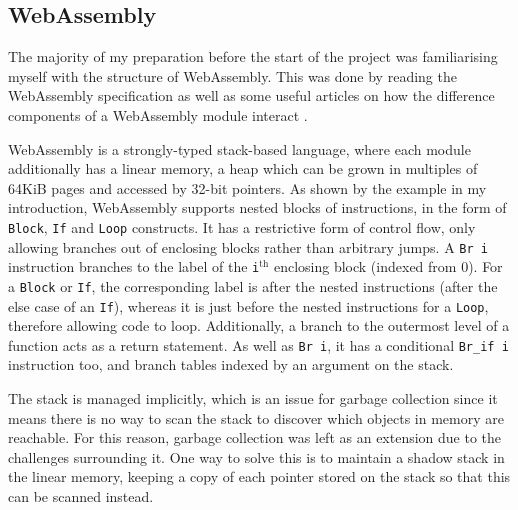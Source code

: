 

\subsection{WebAssembly}
The majority of my preparation before the start of the project was familiarising myself with the structure of WebAssembly.
This was done by reading the WebAssembly specification \cite{wasm} as well as some useful articles on how the difference components of a WebAssembly module interact \cite{wasm-article}.

WebAssembly is a strongly-typed stack-based language, where each module additionally has a linear memory, a heap which can be grown in multiples of 64KiB pages and accessed by 32-bit pointers. As shown by the example in my introduction, WebAssembly supports nested blocks of instructions, in the form of \verb|Block|, \verb|If| and \verb|Loop| constructs. It has a restrictive form of control flow, only allowing branches out of enclosing blocks rather than arbitrary jumps. A \verb|Br i| instruction branches to the label of the \verb|i|$^{\text{th}}$ enclosing block (indexed from 0). For a \verb|Block| or \verb|If|, the corresponding label is after the nested instructions (after the else case of an \verb|If|), whereas it is just before the nested instructions for a \verb|Loop|, therefore allowing code to loop. Additionally, a branch to the outermost level of a function acts as a return statement. As well as \verb|Br i|, it has a conditional \verb|Br_if i| instruction too, and branch tables indexed by an argument on the stack.


The stack is managed implicitly, which is an issue for garbage collection since it means there is no way to scan the stack to discover which objects in memory are reachable. For this reason, garbage collection was left as an extension due to the challenges surrounding it. One way to solve this is to maintain a shadow stack in the linear memory, keeping a copy of each pointer stored on the stack so that this can be scanned instead. 

